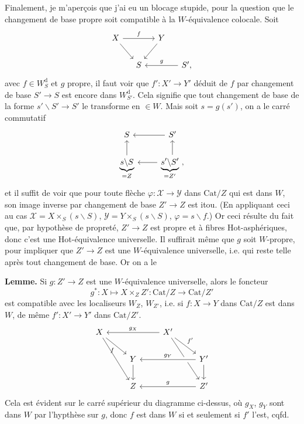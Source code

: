 \documentclass[11pt]{article}
\newcommand{\printedpage}[1]{\marginpar{\footnotesize p.~#1}}
\newcommand{\msp}[1]{\marginpar{\footnotesize [#1]}}
\newcommand{\Cat}{\mathrm{Cat}}
\newcommand{\bs}{\backslash}
\begin{document}
\noindent\printedpage{103}%
\msp{page 168}Finalement, je m'aperçois que j'ai eu un blocage stupide, pour la question que le changement de base propre soit compatible à la $W$-équivalence colocale. Soit
\[
\begin{tikzcd}[column sep=small]
X \arrow[rr, "f"] \arrow[dr] & & Y \arrow[dl] & \\
& S & & S', \arrow[ll, "g"']
\end{tikzcd}
\]
avec $f \in W^{\mathrm{d}}_{S}$ et $g$ propre, il faut voir que $f' : X' \longrightarrow Y'$ déduit de $f$ par changement de base $S' \longrightarrow S$ est encore dans $W^{\mathrm{d}}_{S'}$. Cela signifie que tout changement de base de la forme $s'\bs S' \longrightarrow S'$ le transforme en $\in W$. Mais soit $s = g(s')$, on a le carré commutatif
\[
\begin{tikzcd}
S & S' \arrow[l] \\
\underbrace{s\bs S}_{= Z} \arrow[u] & \underbrace{s'\bs S'}_{= Z'} \arrow[l] \arrow[u] \ ,
\end{tikzcd}
\]
et il suffit de voir que pour toute flèche $\varphi : \mathcal{X} \longrightarrow \mathcal{Y}$ dans $\Cat/Z$ qui est dans $W$, son image inverse par changement de base $Z' \longrightarrow Z$ est itou. (En appliquant ceci au cas $\mathcal{X} = X \times_S (s\bs S)$, $\mathcal{Y} = Y \times_S (s\bs S)$, $\varphi = s\bs f$.) Or ceci résulte du fait que, par \msp{page 169}hypothèse de propreté, $Z' \longrightarrow Z$ est propre et à fibres Hot-asphériques, donc c'est une Hot-équivalence universelle. Il suffirait même que $g$ soit $W$-propre, pour impliquer que $Z' \longrightarrow Z$ est une $W$-équivalence universelle, i.e. qui reste telle après tout changement de base. Or on a le

\noindent\textbf{Lemme.} Si $g : Z' \longrightarrow Z$ est une $W$-équivalence universelle, alors le foncteur
\[
g^* : X \longmapsto X \times_Z Z' : \Cat/Z \longrightarrow \Cat/Z'
\]
est compatible avec les localiseurs $W_Z$, $W_{Z'}$, i.e. si $f : X \longrightarrow Y$ dans $\Cat/Z$ est dans $W$, de même $f' : X' \longrightarrow Y'$ dans $\Cat/Z'$.
\[
\begin{tikzcd}
X \arrow[dr, "f"'] \arrow[ddr] & & X' \arrow[ll, "g_X"'] \arrow[dr, "f'"] \arrow[ddr] & \\
& Y \arrow[d] & & Y' \arrow[ll, "g_Y"', crossing over] \arrow[d] \\
& Z & & Z' \arrow[ll, "g"']
\end{tikzcd}
\]
Cela est évident sur le carré supérieur du diagramme ci-dessus, où $g_X$, $g_Y$ sont dans $W$ par l'hypthèse sur $g$, donc $f$ est dans $W$ si et seulement si $f'$ l'est, cqfd. %
\end{document}
